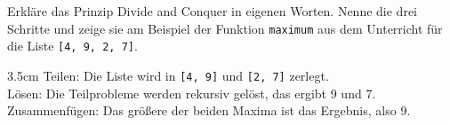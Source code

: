 \question[3]
Erkläre das Prinzip Divide and Conquer in eigenen Worten. Nenne die drei Schritte und zeige sie am Beispiel der Funktion \texttt{maximum} aus dem Unterricht für die Liste \texttt{[4, 9, 2, 7]}.
\begin{solutionbox}{3.5cm}
Teilen: Die Liste wird in \texttt{[4, 9]} und \texttt{[2, 7]} zerlegt. \\
Lösen: Die Teilprobleme werden rekursiv gelöst, das ergibt 9 und 7. \\
Zusammenfügen: Das größere der beiden Maxima ist das Ergebnis, also 9.
\end{solutionbox}
